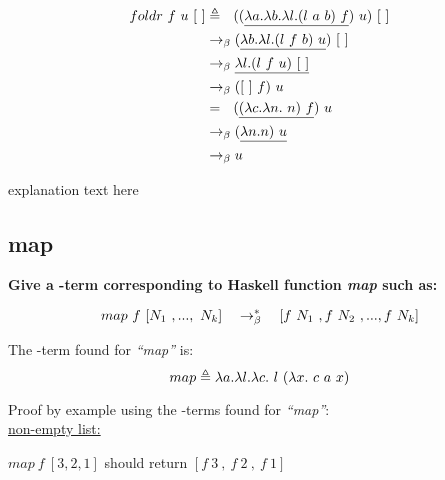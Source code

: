 \documentclass{article}
\begin{document}
\begin{Large}
		\begin{align*}
			foldr \ f \ u \ [ \ ] &\triangleq \saq ((\underline{\la a.\la b.\la l.(l \ a \ b) \ f}) \ u) \ [ \ ] \\
			&\equals (\underline{\la b.\la l.(l \ f \ b) \ u}) \ [ \ ] \\
			&\equals \underline{\la l.(l \ f \ u) \ [ \ ]} \\
			&\equals ([ \ ] \ f) \ u \\
			&= \saq  (\underline{(\la c.\la n. \ n) \ f} )\ u \\
			&\equals (\underline{\la n.n) \ u} \\
			&\equals u
		\end{align*}
		
		explanation text here
		\newline
		
		
	\subsection{map}
		
		\textbf{Give a \lamb -term corresponding to Haskell function \textit{map} such as:}
		
		\begin{equation*}
			map \ f \ [N_1\ ,..., \ N_k] \quad \rightarrow_\beta^*\quad [f \ N_1 \ , f \ N_2 \ ,...,f \ N_k]
		\end{equation*}
		\newline
		
		The \lamb -term found for \textit{``map''} is:
		\begin{equation*}
			map \triangleq \la a.\la l.\la c. \ l \ (\la x.\ c \ a \ x)
		\end{equation*}
		\newline
		
		Proof by example using the \lamb -terms found for  \textit{``map''}:\\
		
		\underline{non-empty list:}
		\newline
		
		$map \ f \ [3,2,1]$ should return $ [f \ 3 \ , \ f \ 2 \ , \  f \ 1]$
		

\end{Large}
\end{document}
